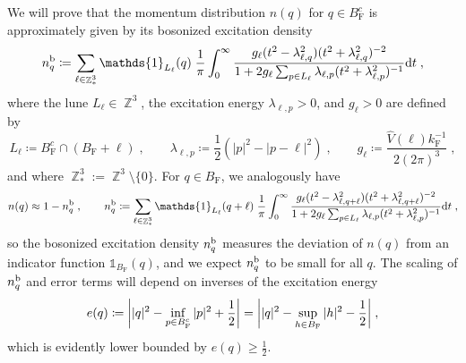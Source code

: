 \documentclass[12pt,a4paper]{article}
\numberwithin{equation}{section}
\newcommand{\1}{\mathbb{I}}
\renewcommand{\b}{\textnormal{b}}
\newcommand{\F}{\mathrm{F}}
\DeclareMathOperator{\Z}{\mathbb{Z}}
\newcommand{\half}{\frac{1}{2}}
\theoremstyle{plain}
\theoremstyle{definition}
\theoremstyle{remark}
\theoremstyle{plain}
\theoremstyle{definition}
\theoremstyle{remark}
\begin{document}
We will prove that the momentum distribution $ n(q) $ for $ q \in B_{\F}^c $ is approximately given by its bosonized excitation density
\begin{equation} \label{eq:nqb}
	n_q^{\b}
	\coloneq \sum\limits_{\ell \in \Z^3_*}\mathds{1}_{L_{\ell}}(q) \; \frac{1}{\pi}\int_0^\infty \frac{g_\ell (t^2-\lambda^2_{\ell,q}) (t^2 + \lambda^2_{\ell,q})^{-2}}{1 + 2g_\ell \sum_{p \in L_{\ell}}\lambda_{\ell,p} (t^2+\lambda^2_{\ell,p})^{-1}} \mathrm{d}t \;,
\end{equation}
where the lune $ L_\ell \in \Z^3 $, the excitation energy $ \lambda_{\ell,p} > 0 $, and $ g_\ell > 0 $ are defined by
\begin{equation} \label{eq:Lell}
	L_\ell \coloneq B_{\F}^c \cap (B_{\F} + \ell) \;, \qquad
	\lambda_{\ell,p} \coloneq \half (|p|^2 - |p-\ell|^2) \;, \qquad
	g_\ell \coloneq \frac{\hat{V}(\ell) k_{\F}^{-1}}{2 (2 \pi)^3} \;,
\end{equation}
and where $ \Z^3_* := \Z^3 \setminus \{0\} $. For $ q \in B_{\F} $, we analogously have
\begin{equation}
	n(q) \approx 1 - n_q^{\b} \;, \qquad
	n_q^{\b}
	\coloneq \sum\limits_{\ell \in \Z^3_*}\mathds{1}_{L_{\ell}}(q+\ell) \; \frac{1}{\pi}\int_0^\infty \frac{g_\ell (t^2-\lambda^2_{\ell,q+\ell}) (t^2 + \lambda^2_{\ell,q+\ell})^{-2}}{1 + 2g_\ell \sum_{p \in L_{\ell}}\lambda_{\ell,p} (t^2+\lambda^2_{\ell,p})^{-1}} \mathrm{d}t \;,
\end{equation}
so the bosonized excitation density $ n_q^{\b} $ measures the deviation of $ n(q) $ from an indicator function $ \mathds{1}_{B_{\F}}(q) $, and we expect $ n_q^{\b} $ to be small for all $ q $. The scaling of $ n_q^{\b} $ and error terms will depend on inverses of the excitation energy
\begin{equation} \label{eq:eq}
	e(q)
	\coloneq \abs{|q|^2 - \inf_{p \in B_{\F}^c} |p|^2 + \half}
	= \abs{|q|^2 - \sup_{h \in B_{\F}} |h|^2 - \half} \;,
\end{equation}
which is evidently lower bounded by $ e(q) \ge \half $.
\end{document}

